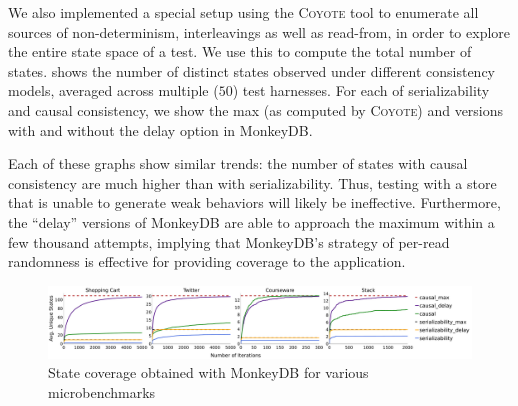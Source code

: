 We also implemented a special setup using the \textsc{Coyote} tool \cite{coyote-web} 
to enumerate all sources of non-determinism, interleavings as well as
read-from, in order to explore the entire state space of a
test. We use this to compute the total number of states. 
shows the number of distinct 
states observed under different consistency models, averaged across multiple ($50$) test
harnesses. For each of serializability and causal consistency, we show the max
(as computed by \textsc{Coyote}) and versions with and without the delay option
in MonkeyDB. 

Each of these graphs show similar trends: the number of states with
causal consistency are much higher than with serializability. Thus, testing with a
store that is unable to generate weak behaviors will likely be ineffective.
Furthermore, the ``delay'' versions of MonkeyDB are able to approach the 
maximum within a few thousand attempts, implying that MonkeyDB's strategy of
per-read randomness is effective for providing coverage to the application.


\begin{figure}[!h]
	\centering
	\includegraphics[width=1.0\textwidth]{Sources/sql/plots/random_avg.pdf}
	\caption{State coverage obtained with MonkeyDB for various microbenchmarks}
	\label{fig:micro_dfs}
\end{figure}

%
%
%
%
%
%
%	
%	
%	
%	
%
%
%	
%	
%	
%	
%
%	
%	
%	
%	


